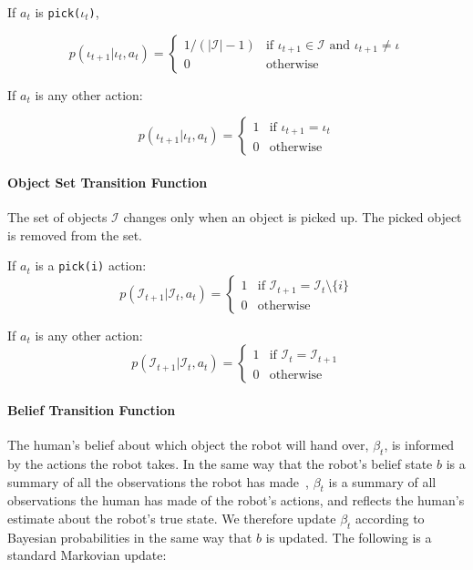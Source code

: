 \documentclass[conference]{IEEEtran}
\newcommand{\Iota}{\mathcal{I}}
\begin{document}
If $a_t$ is \texttt{pick($\iota_t$)}, 

\begin{equation*}
	p(\iota_{t+1} | \iota_t, a_t) = \begin{cases}
		1/(|\Iota|-1) & \text{if } \iota_{t+1} \in \Iota \text{ and } \iota_{t+1} \ne \iota \\
		0 & \text{otherwise} 
	\end{cases}
\end{equation*}


If $a_t$ is any other action: 

\begin{equation*}
	p(\iota_{t+1} | \iota_t, a_t) = \begin{cases} 
		1 & \text{if $\iota_{t+1} = \iota_t$} \\
		0 & \text{otherwise}
	\end{cases}
\end{equation*}

\paragraph{Object Set Transition Function}

The set of objects $\Iota$ changes only when an object is picked up. The picked object is removed from the set. 

If $a_t$ is a \texttt{pick(i)} action: 
\begin{equation*}
	p(\Iota_{t+1} | \Iota_t, a_t) = \begin{cases}
		1 & \text{if $\Iota_{t+1} = \Iota_t \setminus \{i\}$} \\ 
		0 & \text{otherwise}
	\end{cases}
\end{equation*}


If $a_t$ is any other action: 
\begin{equation*}
	p(\Iota_{t+1} | \Iota_t, a_t) = \begin{cases}
		1 & \text{if $\Iota_{t} = \Iota_{t+1}$} \\ 
		0 & \text{otherwise}
	\end{cases}
\end{equation*}

\paragraph{Belief Transition Function}

The human's belief about which object the robot will hand over, $\beta_t$, is informed by the actions the robot takes. In the same way that the robot's belief state $b$ is a summary of all the observations the robot has made~\citep{kaelbling99}, $\beta_t$ is a summary of all observations the human has made of the robot's actions, and reflects the human's estimate about the robot's true state. We therefore update $\beta_t$ according to Bayesian probabilities in the same way that $b$ is updated. The following is a standard Markovian update: 
\end{document}
